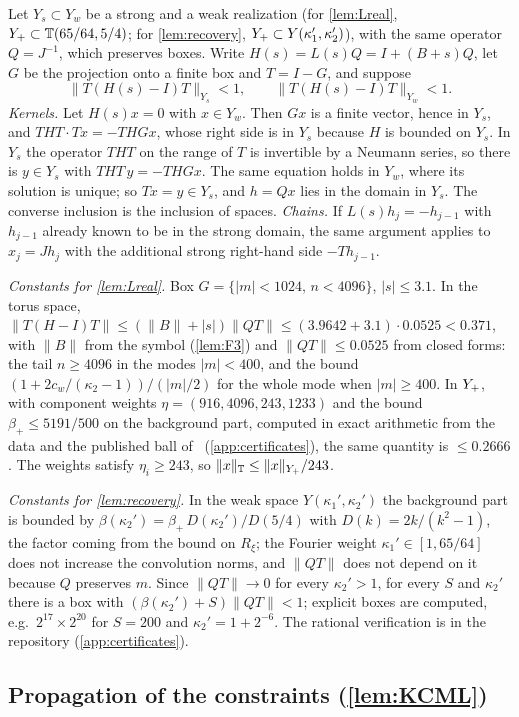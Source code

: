 Let $Y_s\subset Y_w$ be a strong and a weak realization (for \cref{lem:Lreal}, $Y_{+}\subset\mathbb T(65/64,5/4)$;
for \cref{lem:recovery}, $Y_{+}\subset Y(\kappa_1',\kappa_2')$), with the same operator $Q=J^{-1}$, which preserves
boxes. Write $H(s)=L(s)Q=I+(B+s)Q$, let $G$ be the projection onto a finite box and $T=I-G$, and suppose
\[
  \|T(H(s)-I)T\|_{Y_s}<1,\qquad \|T(H(s)-I)T\|_{Y_w}<1 .
\]
\emph{Kernels.} Let $H(s)x=0$ with $x\in Y_w$. Then $Gx$ is a finite vector, hence in $Y_s$, and
$THT\cdot Tx=-THGx$, whose right side is in $Y_s$ because $H$ is bounded on $Y_s$. In $Y_s$ the operator $THT$ on the
range of $T$ is invertible by a Neumann series, so there is $y\in Y_s$ with $THT\,y=-THGx$. The same equation holds
in $Y_w$, where its solution is unique; so $Tx=y\in Y_s$, and $h=Qx$ lies in the domain in $Y_s$. The converse
inclusion is the inclusion of spaces. \emph{Chains.} If $L(s)h_j=-h_{j-1}$ with $h_{j-1}$ already known to be in the
strong domain, the same argument applies to $x_j=Jh_j$ with the additional strong right-hand side $-Th_{j-1}$.

\emph{Constants for \cref{lem:Lreal}.} Box $G=\{|m|<1024,\,n<4096\}$, $|s|\le3.1$. In the torus space,
$\|T(H-I)T\|\le(\|B\|+|s|)\|QT\|\le(3.9642+3.1)\cdot0.0525<0.371$, with $\|B\|$ from the symbol (\cref{lem:F3}) and
$\|QT\|\le0.0525$ from closed forms: the tail $n\ge4096$ in the modes $|m|<400$, and the bound
$(1+2c_w/(\kappa_2-1))/(|m|/2)$ for the whole mode when $|m|\ge400$. In $Y_{+}$, with component weights
$\eta=(916,4096,243,1233)$ and the bound $\beta_+\le5191/500$ on the background part, computed in exact
arithmetic from the data and the published ball of~\cite{RT2019} (\cref{app:certificates}), the same quantity is
$\le0.2666$. The weights satisfy $\eta_i\ge243$, so $\|x\|_{\mathbb T}\le\|x\|_{Y_{+}}/243$.

\emph{Constants for \cref{lem:recovery}.} In the weak space $Y(\kappa_1',\kappa_2')$ the background part is bounded by
$\beta(\kappa_2')=\beta_+\,D(\kappa_2')/D(5/4)$ with $D(k)=2k/(k^2-1)$, the factor coming from the bound on $R_\xi$; the
Fourier weight $\kappa_1'\in[1,65/64]$ does not increase the convolution norms, and $\|QT\|$ does not depend on it
because $Q$ preserves $m$. Since $\|QT\|\to0$ for every $\kappa_2'>1$, for every $S$ and $\kappa_2'$ there is a box with
$(\beta(\kappa_2')+S)\|QT\|<1$; explicit boxes are computed, e.g.\ $2^{17}\times2^{20}$ for $S=200$ and
$\kappa_2'=1+2^{-6}$. The rational verification is in the repository (\cref{app:certificates}).

\subsection{Propagation of the constraints (\cref{lem:KCML})}\label{app:KCML}

